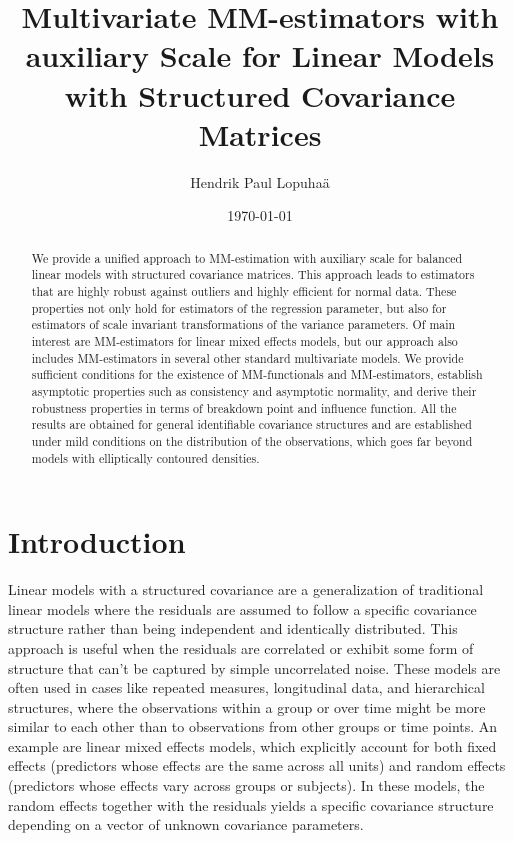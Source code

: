 \documentclass{article}
\numberwithin{equation}{section}
\theoremstyle{plain}
\begin{document}
\title{Multivariate MM-estimators with auxiliary Scale for Linear Models with Structured Covariance Matrices}

\author[1]{Hendrik Paul Lopuha\"a}
\date{\today}

\maketitle


\begin{abstract}
We provide a unified approach to MM-estimation with auxiliary scale for balanced linear models with structured covariance matrices.
This approach leads to estimators that are highly robust against outliers and highly efficient for normal data.
These properties not only hold for estimators of the regression parameter, 
but also for estimators of scale invariant transformations of the variance parameters.
Of main interest are MM-estimators for linear mixed effects models, but our approach also includes
MM-estimators in several other standard multivariate models.
We provide sufficient conditions for the existence of MM-functionals and MM-estimators,
establish asymptotic properties such as consistency and asymptotic normality,
and derive their robustness properties in terms of breakdown point and influence function.
All the results are obtained for general identifiable covariance structures and are established under mild conditions
on the distribution of the observations, which goes far beyond models with elliptically contoured densities.
\end{abstract}


\section{Introduction}
\label{sec:introduction}
Linear models with a structured covariance are a generalization of traditional linear models where the residuals
are assumed to follow a specific covariance structure rather than being independent and identically distributed. 
This approach is useful when the residuals are correlated or exhibit some form of structure that can't be captured by simple uncorrelated noise.
These models are often used in cases like repeated measures, longitudinal data, and hierarchical structures, 
where the observations within a group or over time might be more similar to each other than to observations from other groups or time points.
An example are linear mixed effects models, which explicitly account for both fixed effects (predictors whose effects are the same across all units) and random effects (predictors whose effects vary across groups or subjects). 
In these models, the random effects together with the residuals yields a specific covariance structure depending 
on a vector of unknown covariance parameters.
\end{document}

